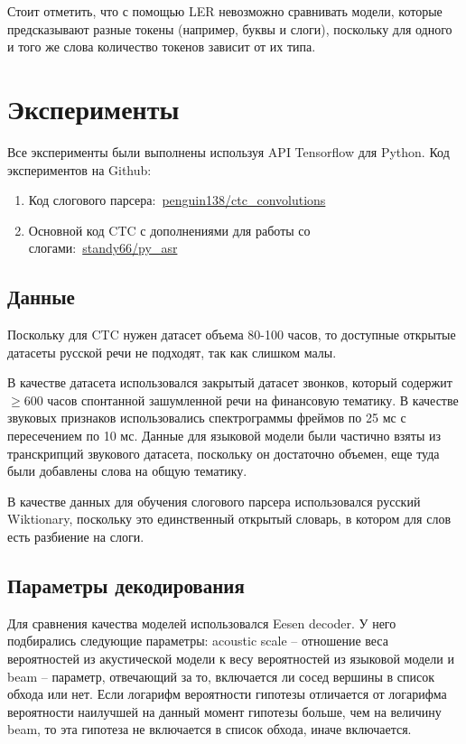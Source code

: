 \documentclass[a4paper,14pt]{extarticle}
\begin{document}
Стоит отметить, что с помощью LER невозможно сравнивать модели, которые предсказывают разные токены (например, буквы и слоги), поскольку для одного и того же слова количество токенов зависит от их типа.
\pagebreak
\section{Эксперименты}
Все эксперименты были выполнены используя API Tensorflow \cite{tensorflow} для Python.
Код экспериментов на Github:
\begin{enumerate}
	\item Код слогового парсера:\  \href{https://github.com/penguin138/ctc_convolutions}{penguin138/ctc\_convolutions}
	\item Основной код CTC с дополнениями для работы со слогами:\ \href{https://github.com/standy66/py_asr}{standy66/py\_asr}
\end{enumerate}
\subsection{Данные}
Поскольку для CTC нужен датасет объема 80-100 часов, то доступные открытые датасеты русской речи не подходят, так как слишком малы.

В качестве датасета использовался закрытый датасет звонков, который содержит $\geq 600$ часов спонтанной зашумленной речи на финансовую тематику. В качестве звуковых признаков использовались спектрограммы фреймов по 25 мс с пересечением по 10 мс.
Данные для языковой модели были частично взяты из транскрипций звукового датасета, поскольку он достаточно объемен, еще туда были добавлены слова на общую тематику.

В качестве данных для обучения слогового парсера использовался русский Wiktionary, поскольку это единственный открытый словарь, в котором для слов есть разбиение на слоги.

\subsection{Параметры декодирования}
Для сравнения качества моделей использовался Eesen decoder. У него подбирались следующие параметры: acoustic scale -- отношение веса вероятностей из акустической модели к весу вероятностей из языковой модели и beam -- параметр, отвечающий за то, включается ли сосед вершины в список обхода или нет. Если логарифм вероятности гипотезы отличается от логарифма вероятности наилучшей на данный момент гипотезы больше, чем на величину beam, то эта гипотеза не включается в список обхода, иначе включается. 
\end{document}
